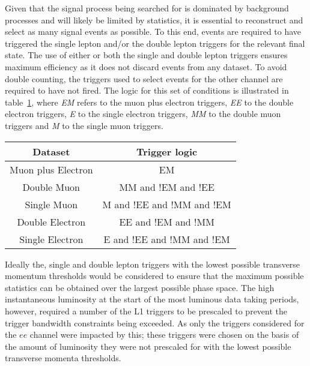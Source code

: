 Given that the signal process being searched for is dominated by background processes and will likely be limited by statistics, it is essential to reconstruct and select as many signal events as possible.
To this end, events are required to have triggered the single lepton and/or the double lepton triggers for the relevant final state.
The use of either or both the single and double lepton triggers ensures maximum efficiency as it does not discard events from any dataset.
To avoid double counting, the triggers used to select events for the other channel are required to have not fired.
The logic for this set of conditions is illustrated in table~\ref{tab:triggerCombo}, where \emph{EM} refers to the muon plus electron triggers, \emph{EE} to the double electron triggers, \emph{E} to the single electron triggers, \emph{MM} to the double muon triggers and \emph{M} to the single muon triggers.

\begin{table}[htbp]
\label{tab:triggerCombo}
  \centering
   \begin{tabular}{cc}
   \hline
   \textbf{Dataset} & \textbf{Trigger logic}  \\
   \hline
   Muon plus Electron & EM \\
   \hline
   Double Muon & MM and !EM and !EE\\
   Single Muon & M and !EE and !MM and !EM \\
   \hline  
   Double Electron & EE and !EM and !MM \\
   Single Electron & E and !EE and !MM and !EM \\
   \hline
 \end{tabular}%
\end{table}

Ideally the, single and double lepton triggers with the lowest possible transverse momentum thresholds would be considered to ensure that the maximum possible statistics can be obtained over the largest possible phase space.
The high instantaneous luminosity at the start of the most luminous data taking periods, however, required a number of the L1 triggers to be prescaled to prevent the trigger bandwidth constraints being exceeded.
As only the triggers considered for the $ee$ channel were impacted by this; these triggers were chosen on the basis of the amount of luminosity they were not prescaled for with the lowest possible transverse momenta thresholds.

